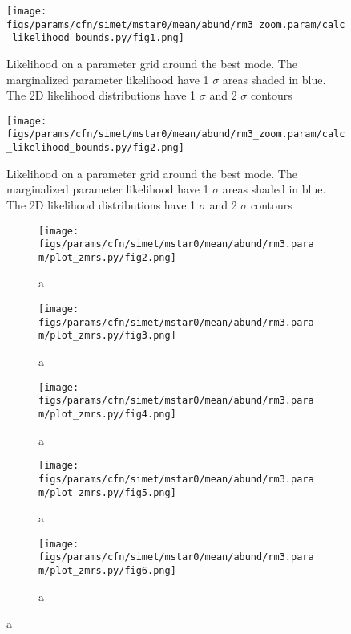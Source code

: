 \documentclass[twocolumn]{article}
\begin{document}
\begin{figure}[H]
  \center\texttt{[image: figs/params/cfn/simet/mstar0/mean/abund/rm3\_zoom.param/calc\_likelihood\_bounds.py/fig1.png]}
  \caption{Likelihood on a parameter grid around the best mode. The marginalized parameter likelihood have
    1 $\sigma$ areas shaded in blue. The 2D likelihood distributions have 1 $\sigma$  and 2 $\sigma$ contours}
  \label{fig:basic_rd:likelihood}
\end{figure}

\begin{figure}[H]
  \center\texttt{[image: figs/params/cfn/simet/mstar0/mean/abund/rm3\_zoom.param/calc\_likelihood\_bounds.py/fig2.png]}
  \caption{Likelihood on a parameter grid around the best mode. The marginalized parameter likelihood have
    1 $\sigma$ areas shaded in blue. The 2D likelihood distributions have 1 $\sigma$  and 2 $\sigma$ contours}
  \label{fig:basic_rd:likelihood}
\end{figure}

\begin{figure}
  \begin{subfigure}{.5\textwidth}
    \centering\texttt{[image: figs/params/cfn/simet/mstar0/mean/abund/rm3.param/plot\_zmrs.py/fig2.png]}
    \caption{a}
  \end{subfigure}
  \begin{subfigure}{.5\textwidth}
    \centering\texttt{[image: figs/params/cfn/simet/mstar0/mean/abund/rm3.param/plot\_zmrs.py/fig3.png]}
    \caption{a}
  \end{subfigure}
  \begin{subfigure}{.5\textwidth}
    \centering\texttt{[image: figs/params/cfn/simet/mstar0/mean/abund/rm3.param/plot\_zmrs.py/fig4.png]}
    \caption{a}
  \end{subfigure}%
  \begin{subfigure}{.5\textwidth}
    \centering\texttt{[image: figs/params/cfn/simet/mstar0/mean/abund/rm3.param/plot\_zmrs.py/fig5.png]}
    \caption{a}
  \end{subfigure}
  \begin{subfigure}{.5\textwidth}
    \centering\texttt{[image: figs/params/cfn/simet/mstar0/mean/abund/rm3.param/plot\_zmrs.py/fig6.png]}
    \caption{a}
  \end{subfigure}
\end{figure}
\clearpage
\end{document}
